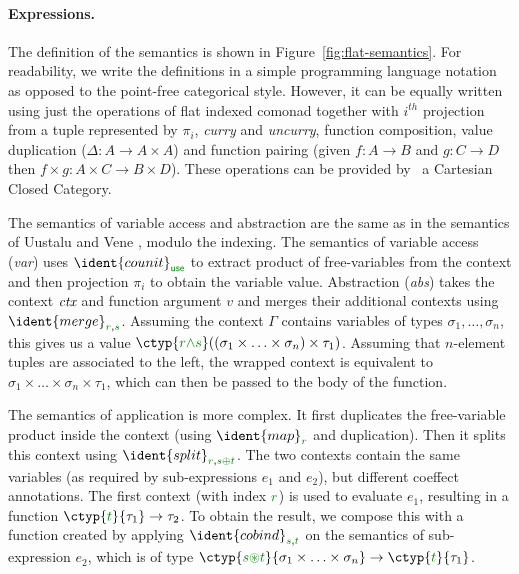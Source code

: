 \paragraph{Expressions.}
The definition of the semantics is shown in Figure~\ref{fig:flat-semantics}. For readability, we 
write the definitions in a simple programming language notation as opposed to the point-free 
categorical style. However, it can be equally written using just the operations of flat indexed 
comonad together with $i^{th}$ projection from a tuple represented by $\pi_i$, \emph{curry} and 
\emph{uncurry}, function composition, value duplication ($\Delta : A \rightarrow A \times A$) and 
function pairing (given $f:A\rightarrow B$ and $g:C\rightarrow D$ then $f\times g : A\times C \rightarrow B \times D$). 
These operations can be provided by \eg~a Cartesian Closed Category.

The semantics of variable access and abstraction are the same as in the semantics of Uustalu and 
Vene \cite{comonads-notions}, modulo the indexing. The semantics of variable access (\emph{var}) uses 
$\ident{counit}_{\cunit}$ to extract product of free-variables from the context and then projection
$\pi_i$ to obtain the variable value. Abstraction (\emph{abs}) takes the context $\textit{ctx}$ and function argument 
$v$ and merges their additional contexts using $\ident{merge}_{\cclrd{r}, \cclrd{s}}$. Assuming
the context $\Gamma$ contains variables of types $\sigma_1, \ldots, \sigma_n$, this gives us a 
value $\ctyp{\cclrd{r}\czip\cclrd{s}}((\sigma_1 \times \ldots \times \sigma_n) \times \tau_1)$.
Assuming that $n$-element tuples are associated to the left, the wrapped context is equivalent to
$\sigma_1 \times \ldots \times \sigma_n \times \tau_1$, which can then be passed to the body of the
function.

The semantics of application is more complex. It first duplicates the free-variable product inside the 
context (using $\ident{map}_{\cclrd{r}}$ and duplication). Then it splits this context using 
$\ident{split}_{\cclrd{r}, \cclrd{s} \cpar \cclrd{t}}$. The two contexts contain the same variables
(as required by sub-expressions $e_1$ and $e_2$), but different coeffect annotations. The first
context (with index $\cclrd{r}$) is used to evaluate $e_1$, resulting in a function 
$\ctyp{\cclrd{t}}{\tau_1} \rightarrow \tau_2$. To obtain the result, we compose this with a function
created by applying $\ident{cobind}_{\cclrd{s}, \cclrd{t}}$ on the semantics of sub-expression
$e_2$, which is of type $\ctyp{\cclrd{s}\cseq\cclrd{t}}{\sigma_1 \times \ldots \times \sigma_n}
\rightarrow \ctyp{\cclrd{t}}{\tau_1}$.

